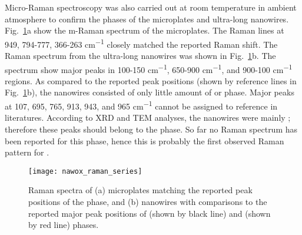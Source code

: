 Micro-Raman spectroscopy was also carried out at room temperature in ambient atmosphere to confirm the phases of the microplates and ultra-long nanowires. Fig.~\ref{fig:nawoxram}a show the m-Raman spectrum of the microplates. The Raman lines at 949, 794-777, 366-263 \si{cm^{-1}} closely matched the reported  Raman shift.\cite{Fomichev1992} The Raman spectrum from the ultra-long nanowires was shown in Fig.~\ref{fig:nawoxram}b. The spectrum show major peaks in 100-150 \si{cm^{-1}}, 650-900 \si{cm^{-1}}, and 900-100 \si{cm^{-1}} regions. As compared to the reported peak positions (shown by reference lines in Fig.~\ref{fig:nawoxram}b), the nanowires consisted of only little amount of  or  phase. Major peaks at 107, 695, 765, 913, 943, and 965 \si{cm^{-1}} cannot be assigned to reference in literatures. According to XRD and TEM analyses, the nanowires were mainly ; therefore these peaks should belong to the  phase. So far no Raman spectrum has been reported for this phase, hence this is probably the first observed Raman pattern for .
\begin{figure}[htb]
\centering
\texttt{[image: nawox\_raman\_series]}
\caption[Raman spectra on sodium tungsten oxides sample]{Raman spectra of (a) microplates matching the reported peak positions of the  phase, and (b) nanowires with comparisons to the reported major peak positions of  (shown by black line) and  (shown by red line) phases.}
\label{fig:nawoxram}
\end{figure}

